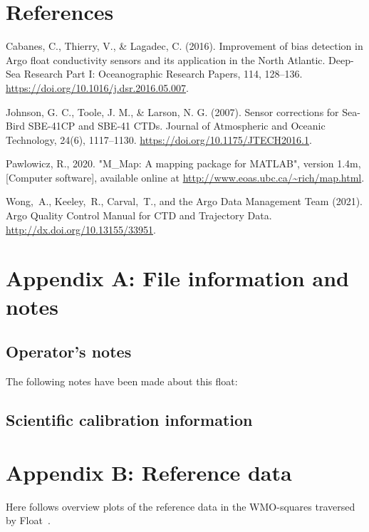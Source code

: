 \documentclass{article}
\begin{document}
\section*{References}
\begin{list}{}{}
\item Cabanes, C., Thierry, V., \& Lagadec, C. (2016). Improvement of bias
  detection in Argo float conductivity sensors and its application in the
  North Atlantic. Deep-Sea Research Part I: Oceanographic Research Papers,
  114, 128–136. \href{url}{https://doi.org/10.1016/j.dsr.2016.05.007}.
\item Johnson, G. C., Toole, J. M., \& Larson, N. G. (2007). Sensor
  corrections for Sea-Bird SBE-41CP and SBE-41 CTDs. Journal of
  Atmospheric and Oceanic Technology, 24(6), 1117–1130.
  \href{url}{https://doi.org/10.1175/JTECH2016.1}.
\item Pawlowicz, R., 2020. "M\_Map: A mapping package for MATLAB", version
  1.4m, [Computer software], available online at
  \url{http://www.eoas.ubc.ca/~rich/map.html}.
\item Wong,~A., Keeley,~R., Carval,~T., and the Argo Data Management Team
  (2021).  Argo Quality Control Manual for CTD and Trajectory Data.
  \href{url}{http://dx.doi.org/10.13155/33951}.
\end{list}



\newpage
\section{Appendix A: File information and notes}\label{sec:appendix-notes}
%
\subsection*{Operator's notes}
The following notes have been made about this float:


\subsection*{Scientific calibration information}
%


\FloatBarrier
\section{Appendix B: Reference data}\label{sec:appendix-refdata}
Here follows overview plots of the reference data in the WMO-squares
traversed by Float~\WMOnum.


\end{document}
